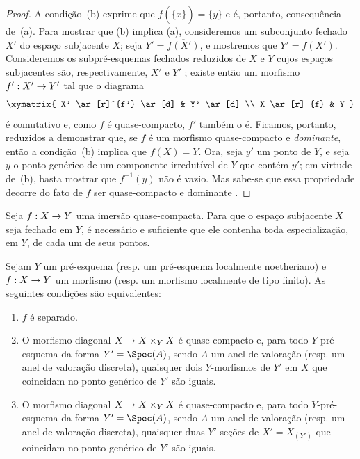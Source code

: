 \documentclass[oneside,10pt]{amsart}
\makeatletter
\newcommand{\ega@arrow}[2]{\mathchoice{#1}{#2}{#2}{#2}}
\renewcommand{\to}{\ega@arrow{\longrightarrow}{\rightarrow}}
\newcommand{\oldpage}[2][]{\marginnote{\normalfont\footnotesize\textbf{#1}~|~#2}\ignorespaces}
\let\EGAOriginalLabel\label
\renewcommand{\label}[1]{\phantomsection\EGAOriginalLabel{#1}}
\makeatother
\begin{document}
\begin{proof}
A condição~(b) exprime que $f(\overline{\{x\}})=\overline{\{y\}}$ e é, portanto, consequência de~(a).
Para mostrar que (b) implica (a), consideremos um subconjunto fechado $X'$ do espaço subjacente $X$;
seja $Y'=\overline{f(X')}$, e mostremos que $Y'=f(X')$.
Consideremos os subpré-esquemas fechados reduzidos de $X$ e $Y$ cujos espaços subjacentes são, respectivamente, $X'$ e $Y'$ ;
existe então um morfismo $f':X'\to Y'$ tal que o diagrama
\[
    \xymatrix{
        X' \ar[r]^{f'} \ar[d]
        & Y' \ar[d]
    \\  X \ar[r]_{f}
        & Y
    }
\]
é comutativo  e, como $f$ é quase-compacto, $f'$ também o é.
Ficamos, portanto, reduzidos a demonstrar que, se $f$ é um morfismo quase-compacto e \emph{dominante}, então
\oldpage[II]{142}
a condição~(b) implica que $f(X)=Y$.
Ora, seja $y'$ um ponto de $Y$, e seja $y$ o ponto genérico de um componente irredutível de $Y$ que contém $y'$;
em virtude de~(b), basta mostrar que $f^{-1}(y)$ não é vazio.
Mas sabe-se que essa propriedade decorre do fato de $f$ ser quase-compacto e dominante .
\end{proof}

\begin{corollary}[7.2.2]
\label{II.7.2.2}
Seja $f:X\to Y$ uma imersão quase-compacta.
Para que o espaço subjacente $X$ seja fechado em $Y$, é necessário e suficiente que ele contenha toda especialização, em $Y$, de cada um de seus pontos.
\end{corollary}

\begin{proposition}[7.2.3]
\label{II.7.2.3}
Sejam $Y$ um pré-esquema (resp. um pré-esquema localmente noetheriano) e $f:X\to Y$ um morfismo (resp. um morfismo localmente de tipo finito).
As seguintes condições são equivalentes:
\begin{enumerate}
    \item[\rm{(a)}] $f$ é separado.
    \item[\rm{(b)}] O morfismo diagonal $X\to X\times_Y X$ é quase-compacto e, para todo $Y$-pré-esquema da forma $Y'=\Spec(A)$, sendo $A$ um anel de valoração (resp. um anel de valoração discreta), quaisquer dois $Y$-morfismos de $Y'$ em $X$ que coincidam no ponto genérico de $Y'$ são iguais.
    \item[\rm{(c)}] O morfismo diagonal $X\to X\times_Y X$ é quase-compacto e, para todo $Y$-pré-esquema da forma $Y'=\Spec(A)$, sendo $A$ um anel de valoração (resp. um anel de valoração discreta), quaisquer duas $Y'$-seções de $X'=X_{(Y')}$ que coincidam no ponto genérico de $Y'$ são iguais.
\end{enumerate}
\end{proposition}
\end{document}
